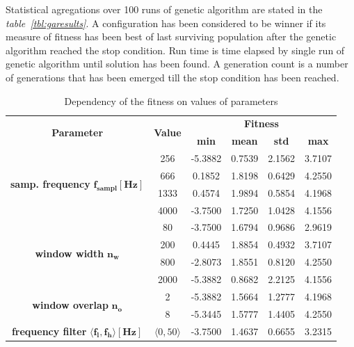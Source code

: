 \documentclass[a4paper]{IEEEtran}
\begin{document}
Statistical agregations over 100 runs of genetic algorithm are stated in the \textit{table~\ref{tbl:garesults}}.
A configuration has been considered to be winner if its measure of fitness has been best of last surviving population
after the genetic algorithm reached the stop condition. Run time is time elapsed by single run of genetic
algorithm until solution has been found.
A generation count is a number of generations that has been emerged till the stop condition has been reached.
\begin{table}[!t]
	\caption{Dependency of the fitness on values of parameters}
	\centering
	\begin{tabular}{|c|c||c|c|c|c|}
		\hline
			\multirow{2}{*}{\textbf{Parameter}} & 
			\multirow{2}{*}{\textbf{Value}} & 
			\multicolumn{4}{c|}{\textbf{Fitness}} \\ 
		\cline{3-6}
			& &
			\textbf{min} &
			\textbf{mean} &
			\textbf{std} &
			\textbf{max} \\
		\hline
		\hline
			\multirow{4}{*}{\parbox[c]{20mm}{\centering\textbf{samp. frequency}\\ $ \mathbf{f_{sampl}[Hz]} $}}
			& 256 & -5.3882 & 0.7539 & 2.1562 & 3.7107\\ \cline{2-6}
			& 666 & 0.1852 & 1.8198 & 0.6429 & 4.2550\\ \cline{2-6}
			& 1333 & 0.4574 & 1.9894 & 0.5854 & 4.1968\\ \cline{2-6}
			& 4000 & -3.7500 & 1.7250 & 1.0428 & 4.1556\\
		\hline
			\multirow{4}{*}{\parbox[c]{20mm}{\centering\textbf{window width}\\ $ \mathbf{n_w} $}}
			& 80 & -3.7500 & 1.6794 & 0.9686 & 2.9619\\ \cline{2-6}
			& 200 & 0.4445 & 1.8854 & 0.4932 & 3.7107\\ \cline{2-6}
			& 800 & -2.8073 & 1.8551 & 0.8120 & 4.2550\\ \cline{2-6}
			& 2000 & -5.3882 & 0.8682 & 2.2125 & 4.1556\\ 
		\hline
			\multirow{2}{*}{\parbox[c]{20mm}{\centering\textbf{window overlap}\\ $ \mathbf{n_o} $}}
			& 2 & -5.3882 & 1.5664 & 1.2777 & 4.1968\\ \cline{2-6}
			& 8 & -5.3445 & 1.5777 & 1.4405 & 4.2550\\
		\hline		
			\multirow{2}{*}{\parbox[c]{20mm}{\centering\textbf{frequency filter}\\$\mathbf{\langle f_l,f_h \rangle[Hz]}$}}
			& $ \langle 0, 50 \rangle $ & -3.7500 & 1.4637 & 0.6655 & 3.2315\\ \cline{2-6}

\end{tabular}
\end{table}
\end{document}
